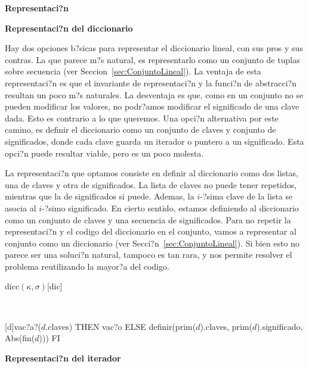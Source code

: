 \documentclass[a4paper,10pt]{article}
\newenvironment{Representacion}{%
  \vspace*{2ex}%
  \noindent\textbf{\Large Representaci?n}%
  \vspace*{2ex}%
}{}
\newcommand{\Titulo}[1]{
  \vspace*{1ex}\par\noindent\textbf{\large #1}\par
}
\begin{document}
\begin{Representacion}
  
  \Titulo{Representaci?n del diccionario}

  Hay dos opciones b?sicas para representar el diccionario lineal, con sus pros y sus contras.  La que parece m?s natural, es representarlo como un conjunto de tuplas sobre secuencia (ver Seccion~\ref{sec:ConjuntoLineal}).  La ventaja de esta representaci?n es que el invariante de representaci?n y la funci?n de abstracci?n resultan un poco m?s naturales.  La desventaja es que, como en un conjunto no se pueden modificar los valores, no podr?amos modificar el significado de una clave dada.  Esto es contrario a lo que queremos.  Una opci?n alternativa por este camino, es definir el diccionario como un conjunto de claves y conjunto de significados, donde cada clave guarda un iterador o puntero a un significado.  Esta opci?n puede resultar viable, pero es un poco molesta.

  La representaci?n que optamos consiste en definir al diccionario como dos listas, una de claves y otra de significados.  La lista de claves no puede tener repetidos, mientras que la de significados si puede.  Ademas, la $i$-?sima clave de la lista se asocia al $i$-?simo significado.  En cierto sentido, estamos definiendo al diccionario como un conjunto de claves y una secuencia de significados.  Para no repetir la representaci?n y el codigo del diccionario en el conjunto, vamos a representar al conjunto como un diccionario (ver Secci?n~\ref{sec:ConjuntoLineal}).  Si bien esto no parece ser una soluci?n natural, tampoco es tan rara, y nos permite resolver el problema reutilizando la mayor?a del codigo.

  \begin{Estructura}{dicc$(\kappa,\sigma)$}[dic]
    \begin{Tupla}[dic]%
    \end{Tupla}
  \end{Estructura}


  ~

  [d]{\IF vac?a?($d$.claves) THEN vac?o ELSE definir(prim($d$).claves, prim($d$).significado, Abs(fin($d$))) FI}

  \Titulo{Representaci?n del iterador}


\end{Representacion}
\end{document}
